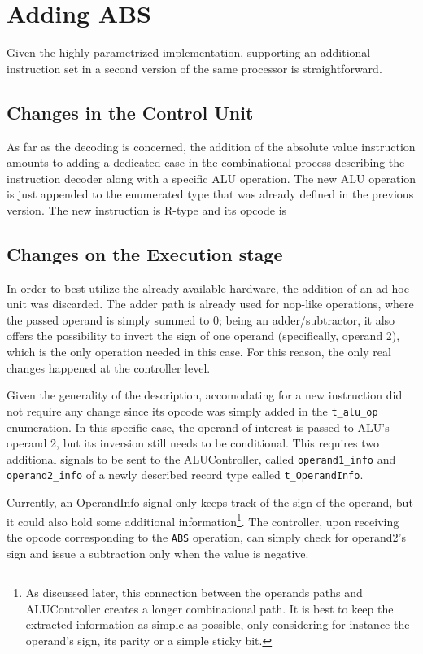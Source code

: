 \section{Adding ABS}
\label{sec:adding-abs}
Given the highly parametrized implementation, supporting an additional instruction set in a second version of the same processor is straightforward.
\subsection{Changes in the Control Unit}
As far as the decoding is concerned, the addition of the absolute value instruction amounts to adding a dedicated case in the combinational process describing the instruction decoder along with a specific ALU operation. The new ALU operation is just appended to the enumerated type that was already defined in the previous version. The new instruction is R-type and its opcode is 
\subsection{Changes on the Execution stage}
In order to best utilize the already available hardware, the addition of an ad-hoc unit was discarded. The adder path
is already used for nop-like operations, where the passed operand is simply summed to 0; being an adder/subtractor,
it also offers the possibility to invert the sign of one operand (specifically, operand 2), which is the only operation
needed in this case. For this reason, the only real changes happened at the controller level.

Given the generality of the description, accomodating for a new instruction did not require any change since its opcode
was simply added in the \texttt{t\_alu\_op} enumeration. In this specific case, the operand of interest is passed to
ALU's operand 2, but its inversion still needs to be conditional. This requires two additional signals to be sent to the
ALUController, called \texttt{operand1\_info} and \texttt{operand2\_info} of a newly described record type called
\texttt{t\_OperandInfo}.

Currently, an OperandInfo signal only keeps track of the sign of the operand, but it could also hold some additional
information\footnote{As discussed later, this connection between the operands paths and ALUController creates a longer
combinational path. It is best to keep the extracted information as simple as possible, only considering for instance
the operand's sign, its parity or a simple sticky bit.}. The controller, upon receiving the opcode corresponding to the
\texttt{ABS} operation, can simply check for operand2's sign and issue a subtraction only when the value is negative.

